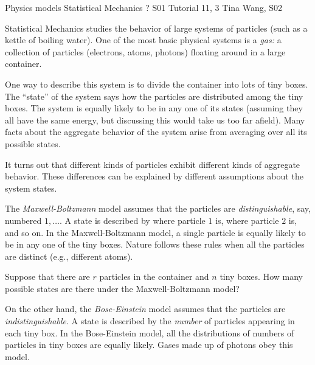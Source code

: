 \problemdata                                                             
        {Physics models} %
        {Statistical Mechanics} %
        {?} %
        {S01 Tutorial 11, 3} %
        {Tina Wang, S02} %
                                                                         
                                                                         
\begin{problem}           
Statistical Mechanics studies the behavior of large systems of
particles (such as a kettle of boiling water).  One of the most basic
physical systems is a {\em gas:} a collection of particles (electrons,
atoms, photons) floating around in a large container. 

One way to describe this system is to divide the container into lots
of tiny boxes.  
The ``state'' of the system says how the particles are distributed among
the tiny boxes. 
The system is equally likely to be in any one of its states (assuming
they all have the same energy, but discussing this would take us too
far afield).  
Many facts about the aggregate behavior of the system arise from
averaging over all its possible states.

It turns out that different kinds of particles exhibit different kinds
of aggregate behavior.
These differences can be explained by different assumptions about the 
system states.

The {\em Maxwell-Boltzmann\/} model assumes that the particles are 
{\em distinguishable}, say, numbered $1,\ldots$.
A state is described by where particle $1$ is, where particle $2$ is,
and so on. 
In the Maxwell-Boltzmann model, a single particle is equally
likely to be in any one of the tiny boxes.
Nature follows these rules when all the particles are
distinct (e.g., different atoms).

\begin{problemparts}

\problempart Suppose that there are $r$ particles in
the container and $n$ tiny boxes.
How many possible states are there under the Maxwell-Boltzmann model?


On the other hand, the {\em Bose-Einstein\/} model assumes that the
particles are {\em indistinguishable\/}.
A state is described by the {\em number\/} of particles appearing in
each tiny box. 
In the Bose-Einstein model, all the distributions of numbers of
particles in tiny boxes are equally likely.
Gases made up of photons obey this model.


\end{problemparts}
\end{problem}
